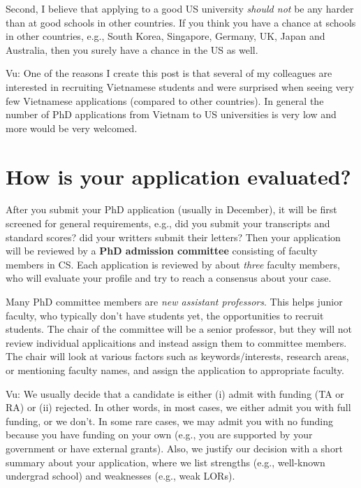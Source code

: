 \documentclass[10pt]{article}
\begin{document}
Second, I believe that applying to a good US university \emph{should not} be any
harder than at good schools in other countries. If you think you have a
chance at schools in other countries, e.g., South Korea, Singapore, Germany, UK, Japan and Australia, then you surely have a chance in
the US as well.

\begin{tcolorbox}[left=1pt,right=1pt,top=1pt,bottom=1pt]
Vu: One of the reasons I create this post is that several of my colleagues are interested in 
recruiting Vietnamese students and were surprised when seeing very few Vietnamese applications (compared to other countries). In general the number of
PhD applications from Vietnam to US universities is very low and  more would be very welcomed. 
\end{tcolorbox}



\section{How is your application evaluated?}

After you submit your PhD application (usually in December), it will be first screened
for general requirements, e.g., did you submit your transcripts and standard scores? did your writters submit their letters?
Then your application will be reviewed by a
\textbf{PhD admission committee} consisting of faculty members in CS. Each application is reviewed by about \emph{three} faculty members, who will evaluate your profile and try to reach a consensus about your case.


Many PhD committee members are \emph{new assistant professors}. This helps junior faculty, who typically don't have students yet, the opportunities to recruit students. The chair of the committee will be a senior professor, but they will not review individual applicaitions and instead assign them to committee members. The chair will look at various factors such as keywords/interests, research areas, or mentioning faculty names, and assign the application to appropriate faculty. 

\begin{tcolorbox}[left=1pt,right=1pt,top=1pt,bottom=1pt]
Vu: We usually decide that a candidate is either (i) admit with funding (TA or RA) or (ii) rejected. In other words, in most cases, we either
admit you with full funding, or we don't. In some rare cases, we may admit
you with no funding because you have funding on your own (e.g., you are
supported by your government or have external grants). Also, we justify
our decision with a short summary about your application, where we list
strengths (e.g., well-known undergrad school) and weaknesses (e.g., weak
LORs).
\end{tcolorbox}
\end{document}
